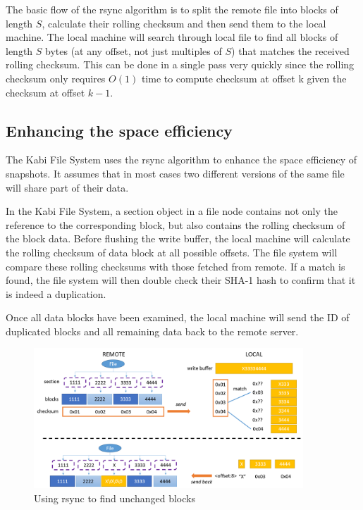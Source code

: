     The basic flow of the rsync algorithm is to split the remote file into blocks of length $S$, calculate their rolling checksum and then send them to the local machine. The local machine will search through local file to find all blocks of length $S$ bytes (at any offset, not just multiples of $S$) that matches the received rolling checksum. This can be done in a single pass very quickly since the rolling checksum only requires $O(1)$ time to compute checksum at offset k given the checksum at offset $k-1$.

\subsection{Enhancing the space efficiency}

    The Kabi File System uses the rsync algorithm to enhance the space efficiency of snapshots. It assumes that in most cases two different versions of the same file will share part of their data.

    In the Kabi File System, a section object in a file node contains not only the reference to the corresponding block, but also contains the rolling checksum of the block data. Before flushing the write buffer, the local machine will calculate the rolling checksum of data block at all possible offsets. The file system will compare these rolling checksums with those fetched from remote. If a match is found, the file system will then double check their SHA-1 hash to confirm that it is indeed a duplication.
    
    Once all data blocks have been examined, the local machine will send the ID of duplicated blocks and all remaining data back to the remote server.


\begin{figure}[t]
\centering
\includegraphics[width=0.9\textwidth]{Chapter-4/figs/fig25.png}
\caption{Using rsync to find unchanged blocks}
\label{fig:rsync}
\end{figure}

